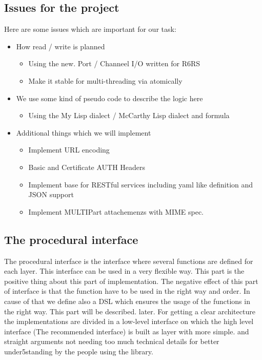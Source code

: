 \documentclass[10pt,a4paper,english]{article}
\begin{document}
\begin{multicols}{2}
\subsection{Issues for the project}
\begin{flushleft}
Here are some issues  which are important for our task:
 \begin{itemize}
 \item{How read / write is planned}
    \begin{itemize}
        \item{Using the new. Port / Channeel I/O written for R6RS}
        \item{Make it stable for multi-threading via atomically}        
    \end{itemize}
\item{We use some kind of pseudo code to describe the logic here}
   \begin{itemize}
        \item{Using the My Lisp dialect / McCarthy Lisp dialect and formula}
    \end{itemize}
\item{Additional things which we will implement}
    \begin{itemize}
       \item{Implement URL encoding}
       \item{Basic and Certificate AUTH Headers} 
       \item{Implement base for RESTful services including yaml like definition and JSON support}
       \item{Implement MULTIPart attachemenzs with MIME spec.}
   \end{itemize}
\end{itemize}
\end{flushleft}


\subsection{The procedural interface}
\begin{flushleft}
The procedural interface is the interface where several functions are defined for each layer. This interface can be used in a very flexible way. This part is the positive thing about this part of implementation. The negative effect of this part of interface is that the function have to be used in the right way and order. In cause of that we define also a DSL which ensures the usage of the functions in the right way. This part will be described. later. 
For getting a clear architecture the implementations are divided in a low-level interface on which the high level interface (The recommended interface) is built as layer with more simple. and straight arguments not needing too much technical details for better under5standing by the people using the library. 
\end{flushleft}



\end{multicols}
\end{document}
